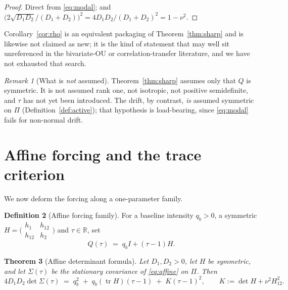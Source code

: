 \documentclass[11pt]{article}
\theoremstyle{plain}
\newtheorem{theorem}{Theorem}
\theoremstyle{definition}
\newtheorem{definition}[theorem]{Definition}
\theoremstyle{remark}
\newtheorem{remark}[theorem]{Remark}
\newcommand{\tr}{\operatorname{tr}}
\newcommand{\Real}{\mathbb{R}}
\newcommand{\Sig}{\Sigma}
\begin{document}
\begin{proof}
Direct from \eqref{eq:modal}; and $\bigl(2\sqrt{D_1D_2}/(D_1+D_2)\bigr)^2=4D_1D_2/(D_1+D_2)^2=1-\nu^2$.
\end{proof}

Corollary~\ref{cor:rho} is an equivalent packaging of Theorem~\ref{thm:sharp} and is likewise not
claimed as new; it is the kind of statement that may well sit unreferenced in the bivariate-OU or
correlation-transfer literature, and we have not exhausted that search.

\begin{remark}[What is \emph{not} assumed]
Theorem~\ref{thm:sharp} assumes only that $Q$ is symmetric. It is not assumed rank one, not
isotropic, not positive semidefinite, and $\tau$ has not yet been introduced. The drift, by
contrast, \emph{is} assumed symmetric on $\Pi$ (Definition~\ref{def:active}); that hypothesis is
load-bearing, since \eqref{eq:modal} fails for non-normal drift.
\end{remark}

\section{Affine forcing and the trace criterion}\label{sec:thm2}

We now deform the forcing along a one-parameter family.

\begin{definition}[Affine forcing family]\label{def:affine}
For a baseline intensity $q_b>0$, a symmetric $H=\bigl(\begin{smallmatrix}h_1&h_{12}\\ h_{12}&h_2\end{smallmatrix}\bigr)$
and $\tau\in\Real$, set
\begin{equation}
  Q(\tau) \;=\; q_b I + (\tau-1)H. \label{eq:affine}
\end{equation}
\end{definition}

\begin{theorem}[Affine determinant formula]\label{thm:affine}
Let $D_1,D_2>0$, let $H$ be symmetric, and let $\Sig(\tau)$ be the stationary covariance of
\eqref{eq:affine} on $\Pi$. Then
\begin{equation}
  4D_1D_2\det\Sig(\tau)
  \;=\; q_b^2 \;+\; q_b(\tr H)(\tau-1) \;+\; K(\tau-1)^2,
  \qquad K:=\det H+\nu^2H_{12}^2. \label{eq:affinedet}
\end{equation}
\end{theorem}
\end{document}

